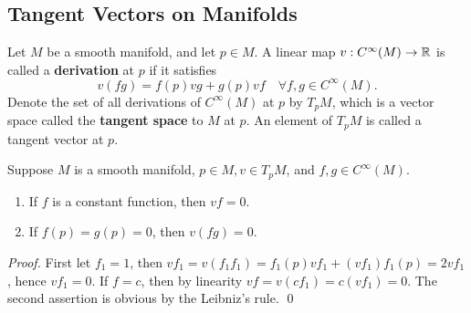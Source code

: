 \subsection{Tangent Vectors on Manifolds}
\begin{definition}
    Let $M$ be a smooth manifold, and let $p \in M$. A linear map $v:C^\infty(M) \to \mathbb{R}$ is called a \textbf{derivation} at $p$ if it satisfies
    $$v(fg) = f(p)vg + g(p)vf \quad \forall f,g \in C^\infty(M). $$
    Denote the set of all derivations of $C^\infty(M)$ at $p$ by $T_p M$, which is a vector space called the \textbf{tangent space} to $M$ at $p$. 
    An element of $T_p M$ is called a tangent vector at $p$.
\end{definition}
\begin{lemma}
    Suppose $M$ is a smooth manifold, $p \in M, v \in T_pM$, and $f,g \in C^\infty(M)$. 
    \begin{enumerate}
    \item If $f$ is a constant function, then $vf = 0$.
    \item If $f(p) = g(p) = 0$, then $v(fg) = 0$.
    \end{enumerate}
\end{lemma}
\begin{proof}
    First let $f_1 = 1$, then $vf_1 = v(f_1 f_1) = f_1(p)vf_1 + (vf_1) f_1(p) 
    = 2vf_1$, hence $vf_1 = 0$. 
    If $f=c$, then by linearity $vf = v(cf_1) = c (vf_1) = 0$. The second assertion is obvious by the Leibniz's rule. \qed     
\end{proof}

